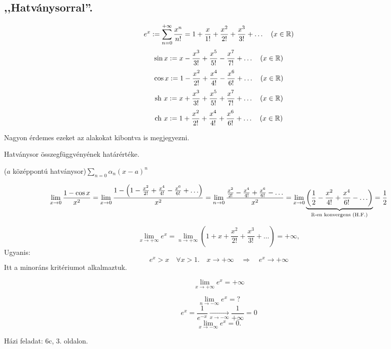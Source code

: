 \documentclass[a4paper,11.5pt]{article}
\begin{document}
	\subsection{,,Hatványsorral''.}
	\begin{revision}
		\[ e^x:=\displaystyle\sum_{n=0}^{+\infty}\frac{x^n}{n!}=1+\frac{x}{1!}+\frac{x^2}{2!}+\frac{x^3}{3!}+\ldots\quad (x\in\mathbb{R}) \]
		\[ \sin x:=x-\frac{x^3}{3!}+\frac{x^5}{5!}-\frac{x^7}{7!}+\ldots\quad (x\in\mathbb{R}) \]
		\[ \cos x :=1-\frac{x^2}{2!}+\frac{x^4}{4!}-\frac{x^6}{6!}+\ldots\quad (x\in\mathbb{R}) \]
		\[ \text{sh } x:=x+\frac{x^3}{3!}+\frac{x^5}{5!}+\frac{x^7}{7!}+\ldots\quad (x\in\mathbb{R}) \]
		\[ \text{ch } x :=1+\frac{x^2}{2!}+\frac{x^4}{4!}+\frac{x^6}{6!}+\ldots\quad (x\in\mathbb{R})  \]
	\end{revision}
	\begin{note}
		Nagyon érdemes ezeket az alakokat kibontva is megjegyezni.
	\end{note}
	\begin{revision}
		Hatványsor összegfüggvényének határértéke.
	\end{revision}
	\begin{revision}
		($a$ középpontú hatványsor)\quad $\displaystyle \sum_{n=0}\alpha_n(x-a)^n$
	\end{revision}
	\begin{task}
		\[ \lim_{x\to0}\frac{1-\cos x}{x^2}=\lim_{x\to0}\frac{1-\left(1-\frac{x^2}{2!}+\frac{x^4}{4!}-\frac{x^6}{6!}+\ldots\right)}{x^2}=\lim_{n\to0}\frac{\frac{x^2}{2!}-\frac{x^4}{4!}+\frac{x^6}{6!}-\ldots}{x^2}=\lim_{x\to0}\underbrace{\left(\frac{1}{2}-\frac{x^2}{4!}+\frac{x^4}{6!}-\ldots\right)}_{\mathbb{R}\text{-en konvergens (H.F.)}}=\frac{1}{2} \]
	\end{task}
	\begin{task}
		\[ \lim_{x\to+\infty}e^x=\lim_{n\to+\infty}\left(1+x+\frac{x^2}{2!}+\frac{x^3}{3!}+\ldots\right)=+\infty, \]
		Ugyanis:
		\[ e^x>x\quad \forall x>1. \quad x\to+\infty \quad \Rightarrow\quad e^x\to+\infty \]
		Itt a minoráns kritériumot alkalmaztuk.
	\end{task}
	\begin{note}
		\[ \lim_{x\to+\infty}e^x=+\infty \]
	\end{note}
	\begin{task}
		\[ \lim_{n\to-\infty}e^x=? \]
		\[ e^x=\frac{1}{e^{-x}}\underset{x\to-\infty}{\longrightarrow}\frac{1}{+\infty}=0 \]
		\[ \lim_{x\to-\infty}e^x=0. \]
	\end{task}
	Házi feladat: 6c, 3. oldalon.
\end{document}
